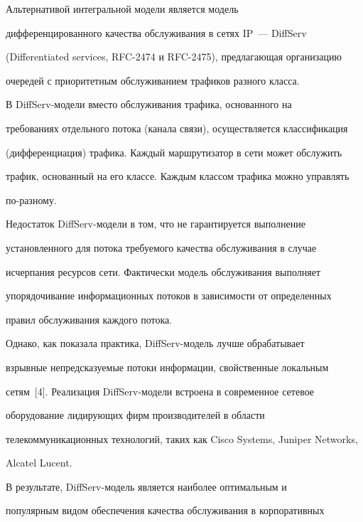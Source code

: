       Альтернативой интегральной модели является модель 


дифференцированного качества обслуживания в сетях IP~--- DiffServ 


(Differentiated services, RFC-2474 и RFC-2475), предлагающая организацию 


очередей с приоритетным обслуживанием трафиков разного класса.


      


      В DiffServ-модели вместо обслуживания трафика, основанного на 


требованиях отдельного потока (канала связи), осуществляется классификация 


(дифференциация) трафика. Каждый маршрутизатор в сети может обслужить 


трафик, основанный на его классе. Каждым классом трафика можно управлять 


по-раз\-ному.


      


      Недостаток DiffServ-модели в том, что не гарантируется выполнение 


установленного для потока требуемого качества обслуживания в случае 


исчерпания ресурсов сети. Фактически модель обслуживания выполняет 


упорядочивание информационных потоков в зависимости от определенных 


правил обслуживания каждого потока.


      


      Однако, как показала практика, DiffServ-модель лучше обрабатывает 


взрывные непредсказуемые потоки информации, свойственные локальным 


сетям~[4]. Реализация DiffServ-модели встроена в современное сетевое 


оборудование лидирующих фирм производителей в области 


телекоммуникационных технологий, таких как Cisco Systems, Juniper Networks, 


Alcatel Lucent.


      


      В результате, DiffServ-модель является наиболее оптимальным и 


популярным видом обеспечения качества обслуживания в корпоративных 


